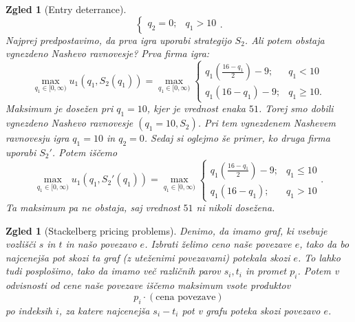 \documentclass[10pt, a4paper]{article}
\newtheorem{zgled}[izr]{Zgled}
\begin{document}
\begin{zgled}[Entry deterrance]
$$\begin{cases}
    q_2 = 0;& q_1 > 10
  \end{cases}.$$
  Najprej predpostavimo, da prva igra uporabi strategijo $S_2$.
  Ali potem obstaja vgnezdeno Nashevo ravnovesje? Prva firma igra:
  $$\max_{q_1 \in [0, \infty)} u_1 (q_1, S_2(q_1)) =\max_{q_1 \in [0, \infty)} \begin{cases}
    q_1 \left(\frac{16 - q_1}{2}\right) - 9;& q_1 < 10\\
    q_1 (16 - q_1) - 9;& q_1 \geq 10.
  \end{cases}$$
  Maksimum je dosežen pri $q_1 = 10$, kjer je vrednost enaka $51$.
  Torej smo dobili vgnezdeno Nashevo ravnovesje 
  $(q_1 = 10, S_2)$. Pri tem vgnezdenem Nashevem ravnovesju igra $q_1 = 10$ in $q_2 = 0$.
  Sedaj si oglejmo še primer, ko druga firma uporabi $S_2'$. Potem iščemo 
  $$\max_{q_1 \in[0, \infty)} u_1 (q_1, S_2'(q_1)) = \max_{q_1 \in [0, \infty)} \begin{cases}
    q_1 \left(\frac{16 - q_1}{2}\right) - 9;& q_1 \leq 10\\
    q_1 (16 - q_1);& q_1 > 10
  \end{cases}.$$
  Ta maksimum pa ne obstaja, saj vrednost $51$ ni nikoli dosežena.
\end{zgled}

\begin{zgled}[Stackelberg pricing problems]
  Denimo, da imamo graf, ki vsebuje vozlišči $s$ in $t$ in našo povezavo $e$.
  Izbrati želimo ceno naše povezave $e$, tako da bo najcenejša pot skozi ta graf (z uteženimi povezavami)
  potekala skozi $e$. To lahko tudi posplošimo, tako da imamo več različnih parov $s_i, t_i$
  in promet $p_i$. Potem v odvisnosti od cene naše povezave iščemo maksimum vsote produktov $$p_i \cdot (\textrm{cena povezave})$$ po indeksih
  $i$, za katere najcenejša $s_i-t_i$ pot v grafu poteka skozi povezavo $e$.  
\end{zgled}
\end{document}
